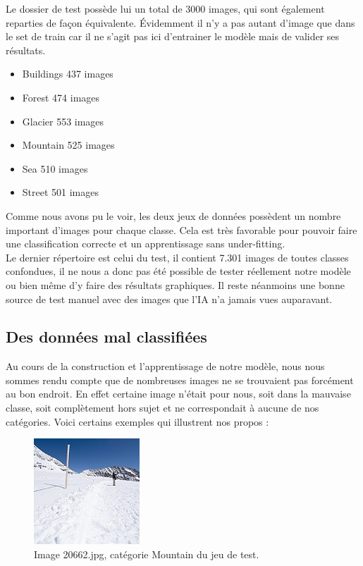 \documentclass[12pt ,a4paper ]{article}
\begin{document}
\begin{multicols}{2}
Le dossier de test possède lui un total de 3000 images, qui sont également reparties de façon équivalente. Évidemment il n'y a pas autant d'image que dans le set de train car il ne s'agit pas ici d'entrainer le modèle mais de valider ses résultats. 

\bigskip
\begin{itemize}
\item Buildings 437 images
\item Forest 474 images
\item Glacier 553 images
\item Mountain 525 images
\item Sea 510 images
\item Street 501 images
\end{itemize}
\bigskip

Comme nous avons pu le voir, les deux jeux de données possèdent un nombre important d'images  pour chaque classe. Cela est très favorable pour pouvoir faire une classification correcte et un apprentissage sans under-fitting.\\

Le dernier répertoire est celui du test, il contient 7.301 images de toutes classes confondues, il ne nous a donc pas été possible de tester réellement notre modèle ou bien même d'y faire des résultats graphiques. Il reste néanmoins une bonne source de test manuel avec des images que l'IA n'a jamais vues auparavant.  

\subsection{Des données mal classifiées}
Au cours de la construction et l'apprentissage de notre modèle, nous nous sommes rendu compte que de nombreuses images ne se trouvaient pas forcément au bon endroit. En effet certaine image n'était pour nous, soit dans la mauvaise classe, soit complètement hors sujet et ne correspondait à aucune de nos catégories. 
Voici certains exemples qui illustrent nos propos :

\begin{figure}[H]
\begin{center}
\includegraphics[scale=1]{./img/20662.jpg}
\caption{\small{Image 20662.jpg, catégorie Mountain du jeu de test.}}
\end{center}
\end{figure}
 

\end{multicols}
\end{document}
